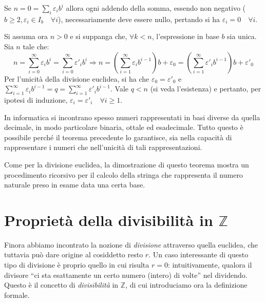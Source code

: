 \documentclass[oneside]{book}
\begin{document}
\begin{tcolorbox}[enhanced, breakable, title={Teorema di rappresentazione dei naturali in base arbitraria}]
Se $n = 0 = \sum_{i} \varepsilon_i b^i$ allora ogni addendo della somma,
essendo non negativo ($b \geq 2, \varepsilon_i \in I_b \quad \forall i$), necessariamente deve essere nullo, pertando si
ha $\varepsilon_i = 0 \quad \forall i$.

Si assuma ora $n > 0$ e si suppanga che, $\forall k < n$, l'espressione
in base $b$ sia unica. Sia $n$ tale che:
\[
    n = \sum_{i=0}^{\infty}\varepsilon_i b^i = \sum_{i=0}^{\infty}\varepsilon'_i b^i \Longrightarrow
    n = \left(\sum_{i=1}^{\infty}\varepsilon_i b^{i-1}\right)b + \varepsilon_0 = \left(\sum_{i=1}^{\infty}\varepsilon'_i b^{i-1}\right)b + \varepsilon'_0
\]
Per l'unicità della divisione euclidea, si ha che $\varepsilon_0 = \varepsilon'_0$
e $\sum_{i=1}^{\infty}\varepsilon_i b^{i-1} = q = \sum_{i=1}^{\infty}\varepsilon'_i b^{i-1}$.
Vale $q < n$ (si veda l'esistenza) e pertanto, per ipotesi di induzione,
$\varepsilon_i = \varepsilon'_i \quad \forall i \geq 1$.
\cvd
\end{tcolorbox}
In informatica si incontrano spesso numeri rappresentati in basi
diverse da quella decimale, in modo particolare binaria, ottale
ed esadecimale. Tutto questo è possibile perché il teorema precedente
lo garantisce, sia nella capacità di rappresentare i numeri che
nell'unicità di tali rappresentazioni.

Come per la divisione euclidea, la dimostrazione di questo teorema
mostra un procedimento ricorsivo per il calcolo della stringa che
rappresenta il numero naturale preso in esame data una certa base.

\begin{tcolorbox}[enhanced, breakable, colback=red!30, colframe=red!30!black, title = {Algoritmo di conversione tra rappresentabilità dei naturali in basi diverse}]

\end{tcolorbox}


\section{Proprietà della divisibilità in $\mathbb{Z}$}
Finora abbiamo incontrato la nozione di \textit{divisione}
attraverso quella euclidea, che tuttavia può dare origine
al cosiddetto resto $r$. Un caso interessante di questo
tipo di divisione è proprio quello in cui risulta $r = 0$:
intuitivamente, qualora il divisore ``ci sta esattamente un certo numero
(intero) di volte'' nel dividendo. Questo è il concetto di
\textit{divisibilità} in $\mathbb{Z}$, di cui introduciamo ora la definizione
formale.
\end{document}
